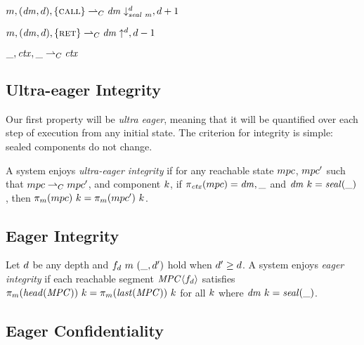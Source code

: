 \documentclass[acmsmall,review,anonymous]{acmart}\settopmatter{printfolios=true,printccs=false,printacmref=false}
\begin{document}
\begin{center}
\begin{minipage}{.4\textwidth}
  \judgment{}
           {\(m,(\mathit{dm},d),\{\text{\sc call}\} \overset{}{\rightharpoonup}_C
             \mathit{dm} \downarrow^{d}_{\mathit{seal} ~ m},d+1\)}
\end{minipage}
\hspace*{0.1\textwidth}
\begin{minipage}{.4\textwidth}
  \judgment{}
           {\(m,(\mathit{dm},d),\{\text{\sc ret}\} \overset{}{\rightharpoonup}_C
             \mathit{dm} \uparrow^{d},d-1\)}
\end{minipage}
\end{center}

\begin{center}
  \judgment[Default]
           {}
           {\(\_,\mathit{ctx},\_ \overset{}{\rightharpoonup}_C \mathit{ctx}\)}
\end{center}

\subsection{Ultra-eager Integrity}

Our first property will be {\em ultra eager}, meaning that it will be quantified over each step
of execution from any initial state. The criterion for integrity is simple: sealed components do not
change.

 A system enjoys {\em ultra-eager integrity} if for any reachable state
\(mpc\), \(mpc'\) such that \(mpc \overset{}{\rightharpoonup}_C mpc'\),
and component \(k\), if \(\pi_{\mathit{ctx}}(mpc) = \mathit{dm},\_\) and
\(\mathit{dm} ~ k = \mathit{seal(\_)}\), then \(\pi_m(mpc) ~ k =
\pi_m(mpc') ~ k\).


\subsection{Eager Integrity}

 Let \(d\) be any depth and \(f_d ~ m ~ (\_, d')\) hold when
\(d' \geq d\). A system enjoys {\em eager integrity} if each reachable segment
\(\mathit{MPC} \langle f_d \rangle\) satisfies \(\pi_m(\mathit{head}(\mathit{MPC})) ~ k =
\pi_m(\mathit{last}(\mathit{MPC})) ~ k\) for all \(k\) where \(\mathit{dm} ~ k =
\mathit{seal(\_)}\).

\subsection{Eager Confidentiality}
\end{document}
